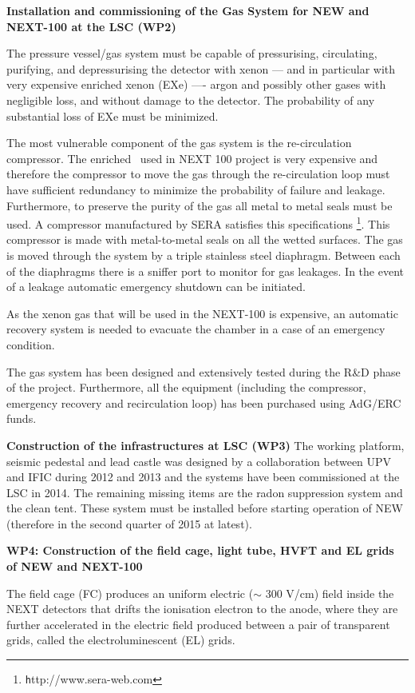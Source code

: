 {\bf Installation and commissioning of the Gas System for NEW and NEXT-100 at the LSC (WP2)}
 
The pressure vessel/gas system must be capable of pressurising, circulating, purifying, and depressurising the detector with xenon --- and in particular with very expensive enriched xenon (EXe) ---- argon and possibly other gases with negligible loss, and without damage to the detector. The probability of any substantial loss of EXe must be minimized. 

The most vulnerable component of the gas system is the re-circulation compressor.
The enriched \Xe\ used in NEXT 100 project is very expensive and therefore the compressor to move the gas through the re-circulation loop
must have sufficient redundancy to minimize the probability of failure and leakage. 
Furthermore, to preserve the purity of the gas all metal to metal seals must be used. A compressor manufactured by SERA satisfies this specifications \footnote{\texttt http://www.sera-web.com}.
This compressor is made with metal-to-metal seals on all the wetted surfaces. The gas is moved through the system by a triple stainless steel diaphragm. Between each
of the diaphragms there is a sniffer port to monitor for gas leakages. In the event of a leakage automatic emergency shutdown can be initiated.

As the xenon gas that will be used in the NEXT-100 is expensive, an automatic recovery system is needed
to evacuate the chamber in a case of an emergency condition. 

The gas system has been designed and extensively tested during the R\&D phase of the project. Furthermore, all the equipment (including the compressor, emergency recovery and recirculation loop) has been purchased using AdG/ERC funds.


{\bf  Construction of the infrastructures at LSC (WP3)}
The working platform, seismic pedestal and lead castle was designed by a collaboration between UPV and IFIC during 2012 and 2013 and the systems have been commissioned at the LSC in 2014. The remaining missing items are the radon suppression system and the clean tent. These system must be installed before starting operation of NEW (therefore in the second quarter of 2015 at latest). 

{\bf WP4: Construction of the field cage, light tube, HVFT and EL grids of NEW and NEXT-100}

The field cage (FC) produces an uniform electric ($\sim$ 300 V/cm) field inside the NEXT detectors that drifts the ionisation electron to the anode, where they are further accelerated in the electric field produced between a pair of transparent grids, called the electroluminescent (EL) grids. 

